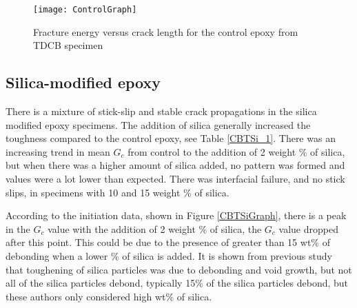 \documentclass[numbers=noendperiod,chapterprefix=on]{icldt} %
\begin{document}
%

\begin{figure}[!htpb]
\centering
\texttt{[image: ControlGraph]}
\caption{Fracture energy versus crack length for the control epoxy from TDCB specimen} \label{ControlGraph}
\end{figure}
\FloatBarrier

\subsection{Silica-modified epoxy}
There is a mixture of stick-slip and stable crack propagations in the silica modified epoxy specimens. The addition of silica generally increased the toughness compared to the control epoxy, see Table \ref{CBTSi_1}. There was an increasing trend in mean $G_c$ from control to the addition of 2 weight \% of silica, but when there was a higher amount of silica added, no pattern was formed and values were a lot lower than expected. There was interfacial failure, and no stick slips, in specimens with 10 and 15 weight \% of silica. 


According to the initiation data, shown in Figure \ref{CBTSiGraph}, there is a peak in the {$G_c$} value with the addition of 2 weight \% of silica, the $G_c$ value dropped after this point. This could be due to the presence of greater than 15 wt\% of debonding when a lower \% of silica is added.
It is shown from previous study \cite{Hsieh2010a, GuildA.J.KinlochandA.C.Taylor}
that toughening of silica particles was due to debonding and void growth, but not all of the silica particles debond, typically 15\% of the silica particles debond, but these authors only considered high wt\% of silica.
\end{document}
